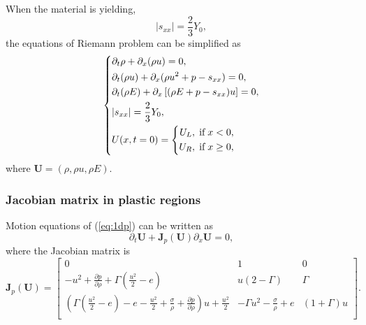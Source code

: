 \documentclass{article}
\numberwithin{equation}{section}
\numberwithin{table}{section}
\begin{document}
When the material is yielding,
\begin{equation}\label{eq:sxxp}
  |s_{xx}| = \frac{2}{3}Y_0,
\end{equation}
the equations of Riemann problem  can be simplified as
\begin{equation}\label{eq:1dp}
   \left\{ \begin{aligned}
       & \partial _t \rho +\partial_x(\rho u)=0,\\
       & \partial _t (\rho u)+\partial_x(\rho u^2 + p -s_{xx})=0,\\
       &\partial _t (\rho E)+\partial_x\left[(\rho E + p -s_{xx})u\right]=0,\\
& |s_{xx}| = \frac{2}{3}Y_{0}, \\
       &U(x,t = 0) = \left\{\begin{aligned}
           U_L, \hspace{0.1cm} \text{if} \hspace{0.1cm} x<0, \\
           U_R, \hspace{0.1cm} \text{if} \hspace{0.1cm} x\ge 0, \\
       \end{aligned}\right.
     \end{aligned}
  \right.
\end{equation}
where $\mathbf{U} = (\rho, \rho u, \rho E )$.
  \subsubsection{Jacobian matrix in  plastic  regions}
 Motion equations of (\ref{eq:1dp}) can be written as
\begin{equation*}
  \partial_t \mathbf{{U}} + \mathbf{J}_p(\mathbf{U})\partial_x \mathbf{{U}}= 0,
\end{equation*}
 where the Jacobian matrix is
\begin{equation*}
\mathbf{J}_p(\mathbf{U}) = \left[\begin{array}{lll}
      0 & 1 & 0   \\
      -u^2 + \frac{\partial p}{\partial \rho} +\Gamma(\frac{u^2}{2}-e)& u(2-\Gamma)& \Gamma \\
	  (\Gamma(\frac{u^2}{2}-e)-e-\frac{u^2}{2}+\frac{\sigma}{\rho}+\frac{\partial p}{\partial \rho})u +\frac{u^2}{2} & -\Gamma u^2 -\frac{\sigma}{\rho} +e & (1+\Gamma)u\\
\end{array}
\right].
\end{equation*}
\end{document}
